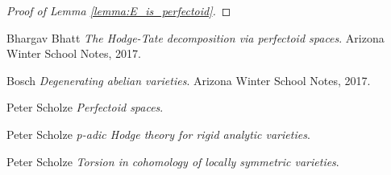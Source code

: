 \documentclass[11pt,oneside]{amsart}
\theoremstyle{theorem}
\theoremstyle{definition}
\theoremstyle{remark}
\begin{document}
\begin{proof}[Proof of Lemma \ref{lemma:E_is_perfectoid}]

\end{proof} 


































































































\newpage



\begin{thebibliography}{9}

Bhargav Bhatt
\textit{The Hodge-Tate decomposition via perfectoid spaces}. 
Arizona Winter School Notes, 2017.

Bosch
\textit{Degenerating abelian varieties}. 
Arizona Winter School Notes, 2017.

Peter Scholze
\textit{Perfectoid spaces}. 


Peter Scholze
\textit{p-adic Hodge theory for rigid analytic varieties}. 

Peter Scholze
\textit{Torsion in cohomology of locally symmetric varieties}.




\end{thebibliography}


 
\end{document}
